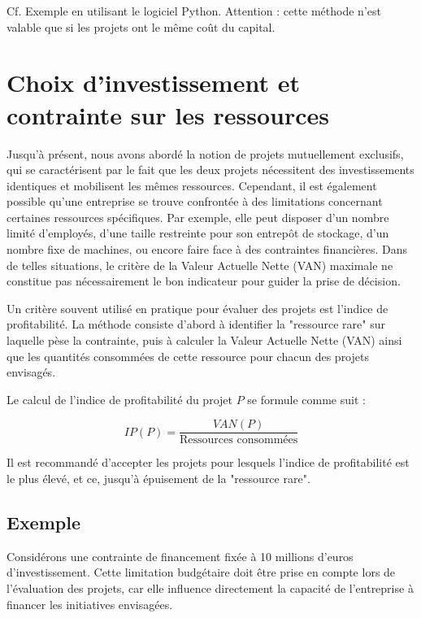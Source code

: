 \documentclass[a4paper, 12pt]{report}
\begin{document}
Cf. Exemple en utilisant le logiciel Python. Attention : cette méthode n'est valable que si les projets ont le même coût du capital.

\section{Choix d'investissement et contrainte sur les ressources}

Jusqu'à présent, nous avons abordé la notion de projets mutuellement exclusifs, qui se caractérisent par le fait que les deux projets nécessitent des investissements identiques et mobilisent les mêmes ressources. Cependant, il est également possible qu'une entreprise se trouve confrontée à des limitations concernant certaines ressources spécifiques. Par exemple, elle peut disposer d'un nombre limité d'employés, d'une taille restreinte pour son entrepôt de stockage, d'un nombre fixe de machines, ou encore faire face à des contraintes financières. Dans de telles situations, le critère de la Valeur Actuelle Nette (VAN) maximale ne constitue pas nécessairement le bon indicateur pour guider la prise de décision.

Un critère souvent utilisé en pratique pour évaluer des projets est l'indice de profitabilité. La méthode consiste d'abord à identifier la "ressource rare" sur laquelle pèse la contrainte, puis à calculer la Valeur Actuelle Nette (VAN) ainsi que les quantités consommées de cette ressource pour chacun des projets envisagés.

Le calcul de l'indice de profitabilité du projet \( P \) se formule comme suit :

\[
I P(P) = \frac{VAN(P)}{\text{Ressources consommées}}
\]

Il est recommandé d'accepter les projets pour lesquels l'indice de profitabilité est le plus élevé, et ce, jusqu'à épuisement de la "ressource rare".

\subsection{Exemple}
Considérons une contrainte de financement fixée à 10 millions d'euros d'investissement. Cette limitation budgétaire doit être prise en compte lors de l'évaluation des projets, car elle influence directement la capacité de l'entreprise à financer les initiatives envisagées.
\end{document}
